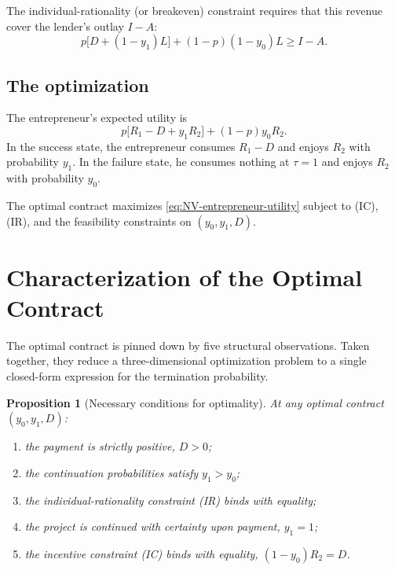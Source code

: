 \documentclass[11pt,a4paper,oneside]{book}
\def\geq{\geqslant}
\theoremstyle{plain}
\newtheorem{proposition}[theorem]{Proposition}
\theoremstyle{definition}
\theoremstyle{remark}
\numberwithin{equation}{chapter}
\begin{document}
The individual-rationality (or breakeven) constraint requires that this revenue cover the lender's outlay $I - A$:
\begin{equation}\label{eq:NV-IR}
  p \bigl[ D + (1 - y_1) L \bigr] + (1 - p)(1 - y_0) L \geq I - A.
  \tag{IR}
\end{equation}

\subsection{The optimization}

The entrepreneur's expected utility is
\begin{equation}\label{eq:NV-entrepreneur-utility}
  p \bigl[ R_1 - D + y_1 R_2 \bigr] + (1 - p) y_0 R_2.
\end{equation}
In the success state, the entrepreneur consumes $R_1 - D$ and enjoys $R_2$ with probability $y_1$.
In the failure state, he consumes nothing at $\tau = 1$ and enjoys $R_2$ with probability $y_0$.

The optimal contract maximizes \eqref{eq:NV-entrepreneur-utility} subject to (IC), (IR), and the feasibility constraints on $(y_0, y_1, D)$.

\section{Characterization of the Optimal Contract}
\label{sec:NV-optimal}

The optimal contract is pinned down by five structural observations.
Taken together, they reduce a three-dimensional optimization problem to a single closed-form expression for the termination probability.

\begin{proposition}[Necessary conditions for optimality]\label{prop:NV-optimal}
At any optimal contract $(y_0, y_1, D)$:
\begin{enumerate}
  \item[\textup{(i)}] the payment is strictly positive, $D > 0$;
  \item[\textup{(ii)}] the continuation probabilities satisfy $y_1 > y_0$;
  \item[\textup{(iii)}] the individual-rationality constraint \textup{(IR)} binds with equality;
  \item[\textup{(iv)}] the project is continued with certainty upon payment, $y_1 = 1$;
  \item[\textup{(v)}] the incentive constraint \textup{(IC)} binds with equality, $(1 - y_0) R_2 = D$.
\end{enumerate}
\end{proposition}
\end{document}
